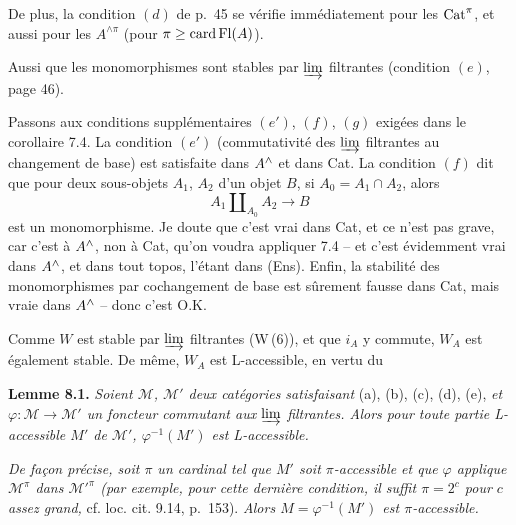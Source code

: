 De plus, la condition $(d)$ de p.~45 se vérifie immédiatement pour les $\mathrm{Cat}^{\pi}$, et aussi pour les $A^{\wedge\pi}$ (pour $\pi\geq\operatorname{card}\mathrm{Fl}(A)$).

Aussi que les monomorphismes sont stables par $\varinjlim$ filtrantes (condition $(e)$, page 46).

Passons aux conditions supplémentaires $(e')$, $(f)$, $(g)$ exigées dans le corollaire 7.4. La condition $(e')$ (commutativité des $\varinjlim$ filtrantes au changement de base) est satisfaite dans $A^{\wedge}$ et dans Cat. La condition $(f)$ dit que pour deux sous-objets $A_1$, $A_2$ d'un objet $B$, si $A_0=A_1\cap A_2$, alors
\[
A_1\amalg_{A_0}A_2 \longrightarrow B
\]
est un monomorphisme. Je doute que c'est vrai dans Cat, et ce n'est pas grave, car c'est à $A^{\wedge}$, non à Cat, qu'on voudra appliquer 7.4 -- et c'est évidemment vrai dans $A^{\wedge}$, et dans tout topos, l'étant dans (Ens). Enfin, la stabilité des monomorphismes par cochangement de base est sûrement fausse dans Cat, mais vraie dans $A^{\wedge}$ -- donc c'est O.K.

Comme $W$ est stable par $\varinjlim$ filtrantes (W\,(6)), et que $i_A$ y commute, $W_A$ est également stable. De même, $W_A$ est L-accessible, en vertu du

\textbf{Lemme 8.1.} \textit{Soient $\mathcal{M}$, $\mathcal{M}'$ deux catégories satisfaisant} (a), (b), (c), (d), (e), \textit{et $\varphi:\mathcal{M}\longrightarrow\mathcal{M}'$ un foncteur commutant aux $\varinjlim$ filtrantes. Alors pour toute partie L-accessible $M'$ de $\mathcal{M}'$, $\varphi^{-1}(M')$ est L-accessible.}

\textit{De façon précise, soit $\pi$ un cardinal tel que $M'$ soit $\pi$-accessible et que $\varphi$ applique $\mathcal{M}^{\pi}$ dans $\mathcal{M}'^{\pi}$ (par exemple, pour cette dernière condition, il suffit $\pi=2^c$ pour $c$ assez grand,} cf. loc. cit. 9.14, p.~153). \textit{Alors $M=\varphi^{-1}(M')$ est $\pi$-accessible.}

